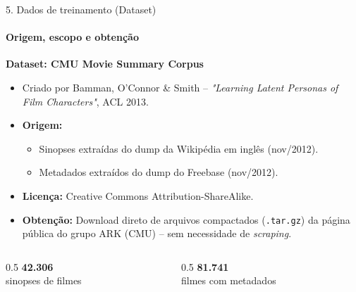 \documentclass[10pt, aspectratio=169]{beamer}
\begin{document}
\begin{frame}{5. Dados de treinamento (Dataset)}
    \framesubtitle{Origem, escopo e obtenção}
    \textbf{Dataset: CMU Movie Summary Corpus}
    \begin{itemize}
        \item Criado por Bamman, O'Connor \& Smith -- \textit{"Learning Latent Personas of Film Characters"}, ACL 2013.
        \item \textbf{Origem:}
        \begin{itemize}
            \item Sinopses extraídas do dump da Wikipédia em inglês (nov/2012).
            \item Metadados extraídos do dump do Freebase (nov/2012).
        \end{itemize}
        \item \textbf{Licença:} Creative Commons Attribution-ShareAlike.
        \item \textbf{Obtenção:} Download direto de arquivos compactados (\texttt{.tar.gz}) da página pública do grupo ARK (CMU) -- sem necessidade de \textit{scraping}.
    \end{itemize}
    \vspace{0.3cm}
    \begin{columns}
        \begin{column}{0.5\textwidth}
            \centering
            \Large \textbf{42.306} \\
            \normalsize sinopses de filmes
        \end{column}
        \begin{column}{0.5\textwidth}
            \centering
            \Large \textbf{81.741} \\
            \normalsize filmes com metadados
        \end{column}
    \end{columns}
\end{frame}
\end{document}
